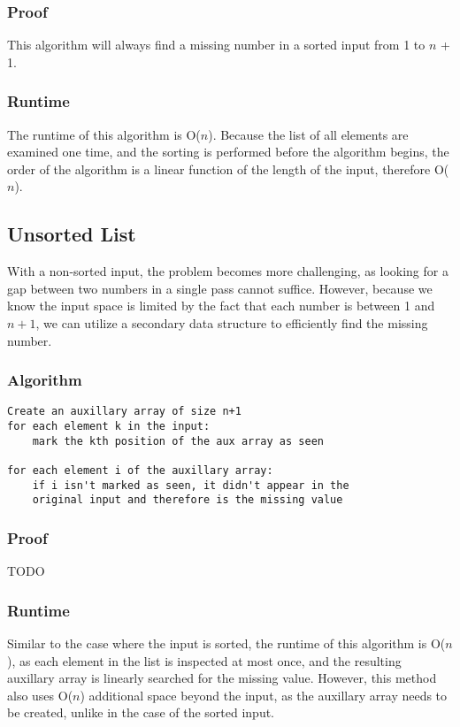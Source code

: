 \documentclass[titlepage]{article}
\numberwithin{equation}{subsection}
\begin{document}
\subsubsection{Proof}
This algorithm will always find a missing number in a sorted
input from 1 to $n$ + 1. 
\subsubsection{Runtime}
The runtime of this algorithm is O($n$). Because the list of
all elements are examined one time, and the sorting is performed
before the algorithm begins, the order of the algorithm is
a linear function of the length of the input, therefore O($n$).
\subsection{Unsorted List}
With a non-sorted input, the problem becomes more challenging, as
looking for a gap between two numbers in a single pass cannot suffice.
However, because we know the input space is limited by the fact that
each number is between 1 and $n+1$, we can utilize a secondary data structure
to efficiently find the missing number.
\subsubsection{Algorithm}
\begin{lstlisting}
Create an auxillary array of size n+1
for each element k in the input:
    mark the kth position of the aux array as seen

for each element i of the auxillary array:
    if i isn't marked as seen, it didn't appear in the 
    original input and therefore is the missing value
\end{lstlisting}
\subsubsection{Proof}
TODO
\subsubsection{Runtime}
Similar to the case where the input is sorted, the runtime
of this algorithm is O($n$), as each element in the list is
inspected at most once, and the resulting auxillary array is
linearly searched for the missing value. However, this method
also uses O($n$) additional space beyond the input, as the
auxillary array needs to be created, unlike in the case of
the sorted input.
\end{document}
